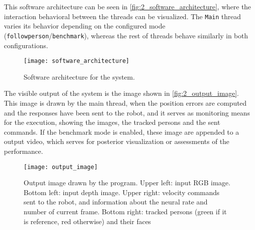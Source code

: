 This software architecture can be seen in \autoref{fig:2_software_architecture}, where the interaction behavioral  between the threads can be visualized. The \texttt{Main} thread varies its behavior depending on the configured mode (\texttt{followperson}/\texttt{benchmark}), whereas the rest of threads  behave similarly in both configurations.

\begin{figure}[h]
	\centering
	\texttt{[image: software\_architecture]}
	\caption{Software architecture for the system.}
	\label{fig:2_software_architecture}
\end{figure}



The visible output of the system is the image shown in \autoref{fig:2_output_image}. This image is drawn by the main thread, when the position errors are computed and the responses have been sent to the robot, and it serves as monitoring means for the execution, showing the images, the tracked persons and the sent commands. If the benchmark mode is enabled, these image are appended to a output video, which serves for posterior visualization or assessments of the performance.

\begin{figure}[h]
	\centering
	\texttt{[image: output\_image]}
	\caption{Output image drawn by the program. Upper left: input RGB image. Bottom left: input depth image. Upper right: velocity commands sent to the robot, and information about the neural rate and number of current frame. Bottom right: tracked persons (green if it is reference, red otherwise) and their faces}
	\label{fig:2_output_image}
\end{figure}




